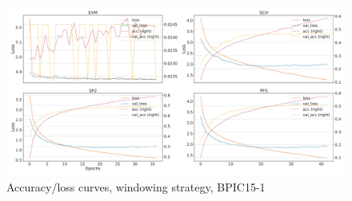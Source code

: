 \begin{figure}[!htb]
    \centering
    \includegraphics[width=\textwidth]{gfx/bpic2015_1/windowed_loss_acc_curve.pdf}
    \caption{Accuracy/loss curves, windowing strategy, BPIC15-1}
\end{figure}
\FloatBarrier

